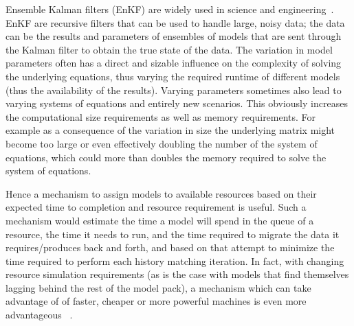 \documentclass[conference,final]{IEEEtran}
\begin{document}

Ensemble Kalman filters (EnKF) are widely used in science and
engineering~\cite{DataAssim, KalmanPaper}. EnKF are recursive filters
that can be used to handle large, noisy data; the data can be the
results and parameters of ensembles of models that are sent through
the Kalman filter to obtain the true state of the data. The variation
in model parameters often has a direct and sizable influence on the
complexity of solving the underlying equations, thus varying the
required runtime of different models (thus the availability of the
results).  Varying parameters sometimes also lead to varying systems
of equations and entirely new scenarios. This obviously increases the
computational size requirements as well as memory requirements.  For
example as a consequence of the variation in size the underlying
matrix might become too large or even effectively doubling the number
of the system of equations, which could more than doubles the memory
required to solve the system of equations.

Hence a mechanism to assign models to available resources based on
their expected time to completion and resource requirement is useful.
Such a mechanism would estimate the time a model will spend in the
queue of a resource, the time it needs to run, and the time required
to migrate the data it requires/produces back and forth, and based on
that attempt to minimize the time required to perform each history
matching iteration.  In fact, with changing resource simulation
requirements (as is the case with models that find themselves lagging
behind the rest of the model pack), a mechanism which can take
advantage of of faster, cheaper or more powerful machines is even more
advantageous ~\cite{escience07}.
\end{document}
